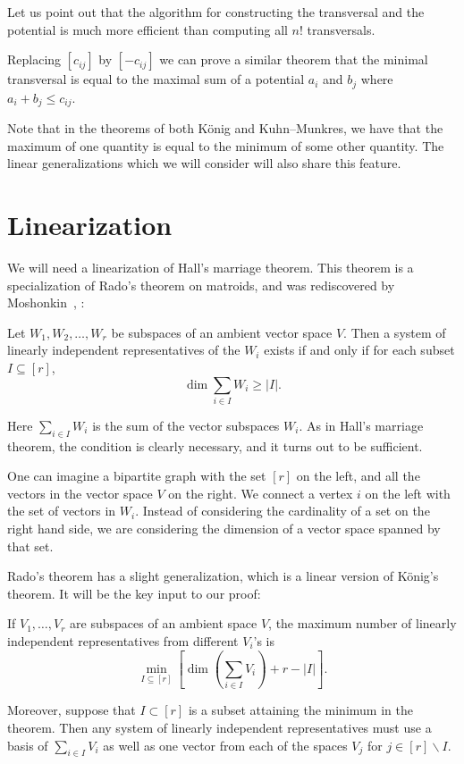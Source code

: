 \documentclass[ALCO,ThmDefs,Unicode,epreuves]{cedram}
\begin{document}
\begin{rema} \label{n!} Let us point out that the algorithm for constructing the transversal and the potential is much more efficient than computing all $n!$ transversals.
\end{rema}

Replacing $[c_{ij}]$ by $[-c_{ij}]$ we can prove a similar theorem that the minimal transversal is equal to the maximal sum of a potential $a_i$ and $b_j$ where $a_i + b_j \leq c_{ij}$.

Note that in the theorems of both K{\"o}nig and Kuhn--Munkres, we have that the maximum of one quantity is equal to the minimum of some other quantity. The linear generalizations which we will consider will also share this feature.


\section{Linearization}\label{sect3}

We will need a linearization of Hall's marriage theorem. This theorem is a specialization of Rado's theorem on matroids, and was rediscovered by Moshonkin~\cite{R}, \cite{M}:
\begin{theorem}[Rado] \label{lin1}
Let $W_1, W_2, \dots, W_r$ be subspaces of an ambient vector space $V$. Then a system of linearly independent representatives of the $W_i$ exists if and only if for each subset $I \subseteq [r]$,
\[
 \dim \sum_{i \in I} W_i \geq |I|.
\]
\end{theorem}

Here $\sum_{i \in I} W_i$ is the sum of the vector subspaces $W_i$. As in Hall's marriage theorem, the condition is clearly necessary, and it turns out to be sufficient. 

One can imagine a bipartite graph with the set $[r]$ on the left, and all the vectors in the vector space $V$ on the right. We connect a vertex $i$ on the left with the set of vectors in $W_i$. Instead of considering the cardinality of a set on the right hand side, we are considering the dimension of a vector space spanned by that set.

Rado's theorem has a slight generalization, which is a linear version of K{\"o}nig's theorem. It will be the key input to our proof:

\begin{prop}[\cite{LO}]\label{lin2}
If $V_1,\ldots,V_r$ are subspaces of an ambient space $V$, the maximum number of linearly independent representatives from different $V_i$'s is
 \begin{equation}\label{eq:vsKonig}
 \min_{I \subseteq [r]} \left[ \dim \left( \sum_{i\in I} V_i \right) + r - |I| \right].
 \end{equation}
\end{prop}
Moreover, suppose that $I \subset [r]$ is a subset attaining the minimum in the theorem. Then any system of linearly independent representatives must use a basis of $\sum_{i\in I} V_i$ as well as one vector from each of the spaces $V_j$ for $j \in [r] \backslash I$.
\end{document}
